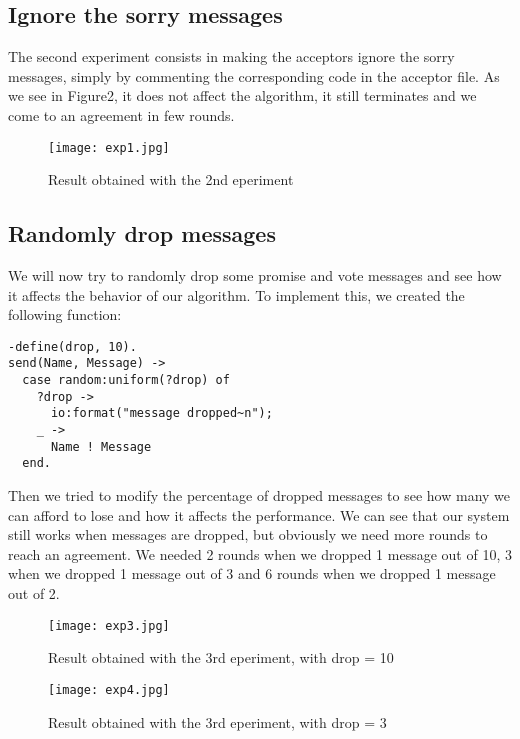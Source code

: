\documentclass[a4paper, 11pt]{article}
\begin{document}
\subsection{Ignore the sorry messages}
The second experiment consists in making the acceptors ignore the sorry messages, simply by commenting the corresponding code in the acceptor file. As we see in Figure2, it does not affect the algorithm, it still terminates and we come to an agreement in few rounds.
\begin{figure}[h!]
\begin{center}
\texttt{[image: exp1.jpg]}
\caption{Result obtained with the 2nd eperiment}
\end{center}
\end{figure}

\subsection{Randomly drop messages}
We will now try to randomly drop some promise and vote messages and see how it affects the behavior of our algorithm. To implement this, we created the following function:
\begin{lstlisting}
-define(drop, 10).
send(Name, Message) ->
  case random:uniform(?drop) of
    ?drop ->
      io:format("message dropped~n");
    _ ->
      Name ! Message
  end.
\end{lstlisting}
Then we tried to modify the percentage of dropped messages to see how many we can afford to lose and how it affects the performance. We can see that our system still works when messages are dropped, but obviously we need more rounds to reach an agreement. We needed 2 rounds when we dropped 1 message out of 10, 3 when we dropped 1 message out of 3 and 6 rounds when we dropped 1 message out of 2.
\begin{figure}[h!]
\begin{center}
\hspace*{-1in}
\texttt{[image: exp3.jpg]}
\caption{Result obtained with the 3rd eperiment, with drop = 10}
\end{center}
\end{figure}

\begin{figure}[h!]
\begin{center}
\hspace*{-1in}
\texttt{[image: exp4.jpg]}
\caption{Result obtained with the 3rd eperiment, with drop = 3}
\end{center}
\end{figure}
 
\end{document}
